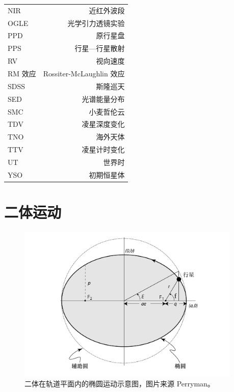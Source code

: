 \begin{multicols}{2}
\begin{tabularx}{0.85\linewidth}{@{\extracolsep{\fill}}lr}
\centering
NIR			&    近红外波段				\\
OGLE		&    光学引力透镜实验		\\
PPD			&    原行星盘				\\
PPS			&    行星---行星散射			\\
RV			&    视向速度				\\
RM 效应		&    Rossiter-McLaughlin 效应	\\
SDSS		&    斯隆巡天				\\
SED			&    光谱能量分布			\\
SMC			&    小麦哲伦云				\\
TDV			&    凌星深度变化			\\
TNO			&    海外天体				\\
TTV			&    凌星计时变化			\\
UT			&    世界时				\\
YSO			&    初期恒星体				\\


\end{tabularx}
\end{multicols}




\chapter{二体运动} \label{apdx:twobodyproblem}

\begin{figure}[h]
\centering
\includegraphics[width=0.95\textwidth]{figures/appendix/f1_ellipse.pdf}
\caption{二体在轨道平面内的椭圆运动示意图，图片来源 Perryman。}
\label{fig:ellipse}
\end{figure}


